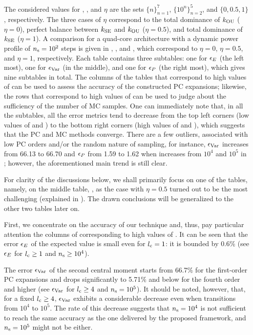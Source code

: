 The considered values for \lc, \ns, and $\eta$ are the sets $\{ n \}_{n = 1}^7$,
$\{ 10^n \}_{n = 2}^5$, and $\{ 0, 0.5, 1 \}$, respectively. The three cases of
$\eta$ correspond to the total dominance of $k_{\mathrm{OU}}$ ($\eta = 0$), perfect
balance between $k_{\mathrm{SE}}$ and $k_{\mathrm{OU}}$ ($\eta = 0.5$), and total dominance of
$k_{\mathrm{SE}}$ ($\eta = 1$). A comparison for a quad-core architecture with a dynamic
power profile of ${n_\mathrm{s}} = 10^2$ steps is given in ,
, and , which correspond to $\eta =
0$, $\eta = 0.5$, and $\eta = 1$, respectively. Each table contains three
subtables: one for $\epsilon_{\expectation}$ (the left most), one for
$\epsilon_{\variance}$ (in the middle), and one for $\epsilon_{\probability}$
(the right most), which gives nine subtables in total. The columns of the tables
that correspond to high values of \ns can be used to assess the accuracy of the
constructed PC expansions; likewise, the rows that correspond to high values of
\lc can be used to judge about the sufficiency of the number of MC samples. One
can immediately note that, in all the subtables, all the error metrics tend to
decrease from the top left corners (low values of \lc and \ns) to the bottom
right corners (high values of \lc and \ns), which suggests that the PC and MC
methods converge. There are a few outliers, associated with low PC orders and/or
the random nature of sampling, for instance, $\epsilon_{\variance}$ increases
from 66.13 to 66.70 and $\epsilon_{\probability}$ from 1.59 to 1.62 when \ns
increases from $10^4$ and $10^5$ in ; however, the
aforementioned main trend is still clear.

For clarity of the discussions below, we shall primarily focus on one of the
tables, namely, on the middle table, , as the case with
$\eta = 0.5$ turned out to be the most challenging (explained in
). The drawn conclusions will be generalized to the other two
tables later on.

First, we concentrate on the accuracy of our technique and, thus, pay particular
attention the columns of  corresponding to high values of
\ns. It can be seen that the error $\epsilon_{\expectation}$ of the expected
value is small even for ${l_\mathrm{c}} = 1$: it is bounded by 0.6\% (see
$\epsilon_{\expectation}$ for ${l_\mathrm{c}} \geq 1$ and ${n_\mathrm{s}} \geq 10^4$).

The error $\epsilon_{\variance}$ of the second central moment starts from 66.7\%
for the first-order PC expansions and drops significantly to 5.71\% and below
for the fourth order and higher (see $\epsilon_{\variance}$ for ${l_\mathrm{c}} \geq 4$ and
${n_\mathrm{s}} = 10^5$). It should be noted, however, that, for a fixed ${l_\mathrm{c}} \geq 4$,
$\epsilon_{\variance}$ exhibits a considerable decrease even when \ns
transitions from $10^4$ to $10^5$. The rate of this decrease suggests that ${n_\mathrm{s}}
= 10^4$ is not sufficient to reach the same accuracy as the one delivered by the
proposed framework, and ${n_\mathrm{s}} = 10^5$ might not be either.

